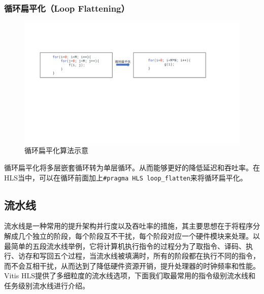 \subsubsection{循环扁平化（Loop Flattening）}
\begin{figure}[htbp]
    \centering
    \includegraphics[width=\linewidth]{figures/loop flattening.pdf}
    \caption{循环扁平化算法示意}
    \label{fig:loop_flattening}
\end{figure}
循环扁平化将多层嵌套循环转为单层循环。从而能够更好的降低延迟和吞吐率。在HLS当中，可以在循环前面加上\verb|#pragma HLS loop_flatten|来将循环扁平化。
\subsection{流水线}

流水线是一种常用的提升架构并行度以及吞吐率的措施，其主要思想在于将程序分解成几个独立的阶段，每个阶段互不干扰，每个阶段对应一个硬件模块来处理。以最简单的五段流水线举例，它将计算机执行指令的过程分为了取指令、译码、执行、访存和写回五个过程，当流水线被填满时，所有的阶段都在执行不同的指令，而不会互相干扰，从而达到了降低硬件资源开销，提升处理器的时钟频率和性能。Vitis HLS提供了多细粒度的流水线选项，下面我们取最常用的指令级别流水线和任务级别流水线进行介绍。


